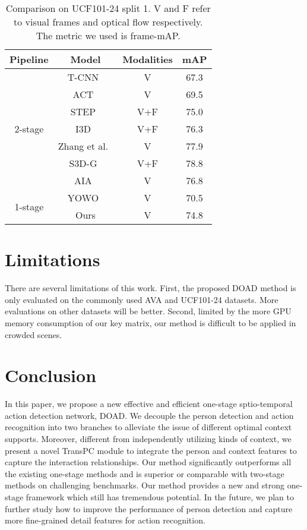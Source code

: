 \documentclass[final]{cvpr}
\begin{document}
\begin{table} [t]
\begin{center}
\small
\begin{tabular}{c|c|c|c}
\toprule
Pipeline & Model & Modalities & mAP  \\
\midrule
\multirow{7}{3em}{2-stage}
& T-CNN~\cite{hou2017tube} & V & 67.3 \\
& ACT~\cite{kalogeiton2017action} & V & 69.5 \\
& STEP~\cite{DBLP:conf/cvpr/YangY0XDK19} & V+F & 75.0 \\
& I3D~\cite{carreira2017quo} & V+F & 76.3 \\
& Zhang et al.~\cite{zhang2019structured} & V & 77.9 \\
& S3D-G~\cite{xie2018rethinking} & V+F & 78.8 \\
& AIA~\cite{DBLP:conf/eccv/TangXMPL20} & V & 76.8 \\
\midrule
\multirow{2}{3em}{1-stage}
& YOWO~\cite{kopuklu2019yowo}& V & 70.5 \\
& Ours & V & 74.8 \\
\bottomrule
\end{tabular}
\end{center}
\vspace{-5mm}
\caption{Comparison on UCF101-24 split 1. V and F refer to visual frames and optical flow respectively. The metric we used is frame-mAP.}
\vspace{-5mm}
\label{ucf}
\end{table}

\section{Limitations}
There are several limitations of this work. First, the proposed DOAD method is only evaluated on the commonly used AVA and UCF101-24 datasets. More evaluations on other datasets will be better. Second, limited by the more GPU memory consumption of our key matrix, our method is difficult to be applied in crowded scenes.

\section{Conclusion}
In this paper, we propose a new effective and efficient one-stage sptio-temporal action detection network, DOAD. We decouple the person detection and action recognition into two branches to alleviate the issue of different optimal context supports. Moreover, different from independently utilizing kinds of context, we present a novel TransPC module to integrate the person and context features to capture the interaction relationships. Our method significantly outperforms all the existing one-stage methods and is superior or comparable with two-stage methods on challenging benchmarks. Our method provides a new and strong one-stage framework which still has tremendous potential. 
In the future, we plan to further study how to improve the performance of person detection and capture more fine-grained detail features for action recognition.
{\small
%
% 


%
}
\end{document}
